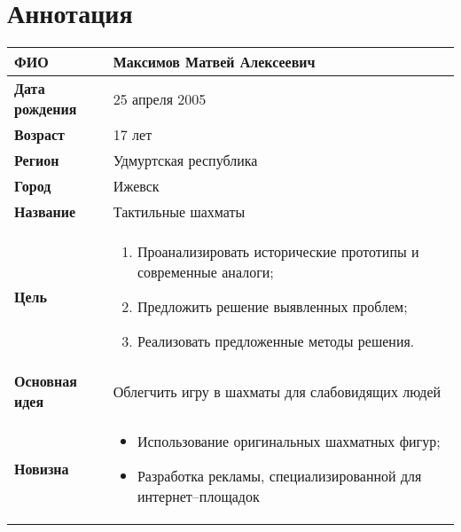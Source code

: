 \section*{Аннотация}
\begin{table}[H]
    \centering
    \begin{tabular}{l p{25em}}
        \toprule
        \textbf{ФИО} & Максимов Матвей Алексеевич \\
        \midrule
        \textbf{Дата рождения} & 25 апреля 2005 \\
        \midrule
        \textbf{Возраст} & 17 лет \\
        \midrule
        \textbf{Регион} & Удмуртская республика \\
        \midrule
        \textbf{Город} & Ижевск \\
        \midrule
        \textbf{Название} & Тактильные шахматы \\
        \midrule
        \textbf{Цель} & 
            \begin{enumerate}
                \item Проанализировать исторические прототипы и современные аналоги;
                \item Предложить решение выявленных проблем;
                \item Реализовать предложенные методы решения.
            \end{enumerate} \\
        \midrule
        \textbf{Основная идея} & Облегчить игру в шахматы для слабовидящих людей \\
        \midrule
        \textbf{Новизна} & 
            \begin{itemize}
                \item Использование оригинальных шахматных фигур;
                \item Разработка рекламы, специализированной для интернет--площадок
            \end{itemize} \\
        \bottomrule
    \end{tabular}
\end{table}
